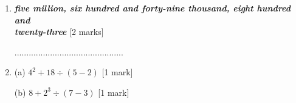 \documentclass{article}
\begin{document}
\begin{enumerate}
\item \quad {} \textit{\textbf{five million, six hundred and forty-nine thousand, eight hundred and }} \\
\textit{\textbf{twenty-three}}  \hspace{2cm} [2 marks]

 
 \par
 \vspace{60pt}
 ..............................................

 \vspace{20pt}
 \hline
 \vspace{10pt}

\item (a) \quad \( 4^{2} + 18 \div (5-2 ) \) \hspace{2cm} [1 mark]
\vspace{80pt}
\hline
\vspace{10pt}

(b) \quad \( 8 + 2^{3} \div (7 - 3 ) \) \hspace {2cm} [1 mark]
\vspace{80pt}
\hline
\vspace{10pt}

\end{enumerate}
\end{document}
